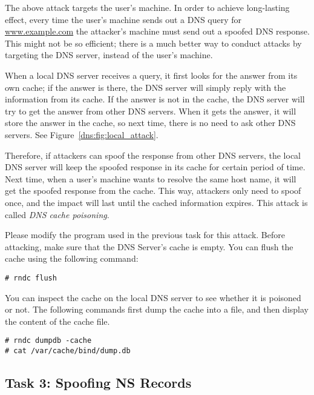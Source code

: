 The above attack targets the user's machine. In order to achieve long-lasting
effect, every time the user's machine sends out a DNS query for
\url{www.example.com}
the attacker's machine must send out a spoofed DNS response. 
This might not be so efficient; there is a much better way to conduct attacks 
by targeting the DNS server, instead of the user's machine.


When a local DNS server receives a query, 
it first looks 
for the answer from its own cache; if the answer is there, 
the DNS server will simply reply with the information from its cache. 
If the answer is not in the cache, the DNS server will 
try to get the answer from other DNS servers. When it gets the 
answer, it will store the answer in the cache, so next time, 
there is no need to ask other DNS servers. See Figure~\ref{dns:fig:local_attack}. 

Therefore, if attackers can spoof the response from other DNS 
servers, the local DNS server will keep the spoofed response in its cache for 
certain period of time. Next time, when a user's machine wants to resolve the 
same host name, it will get the spoofed response from the cache. 
This way, attackers only need to spoof once, and 
the impact will last until the cached information expires. 
This attack is called {\em DNS cache poisoning}.  


Please modify the program used in the previous task for this attack. 
Before attacking, 
make sure that the DNS Server's cache is empty. 
You can flush the cache using the following command:

\begin{lstlisting}
# rndc flush
\end{lstlisting}

You can inspect the cache on the local DNS server to
see whether it is poisoned or not. The following commands
first dump the cache into a file, and then
display the content of the cache file. 

\begin{lstlisting}
# rndc dumpdb -cache
# cat /var/cache/bind/dump.db
\end{lstlisting}



\subsection{Task 3: Spoofing NS Records}


